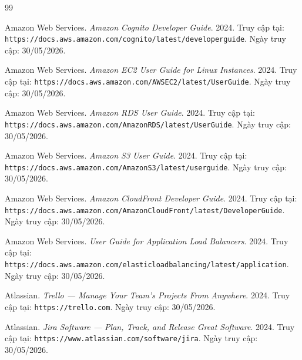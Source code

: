 \begin{thebibliography}{99}

Amazon Web Services. \textit{Amazon Cognito Developer Guide}. 2024. Truy cập tại: \texttt{https://docs.aws.amazon.com/cognito/latest/developerguide}. Ngày truy cập: 30/05/2026.

Amazon Web Services. \textit{Amazon EC2 User Guide for Linux Instances}. 2024. Truy cập tại: \texttt{https://docs.aws.amazon.com/AWSEC2/latest/UserGuide}. Ngày truy cập: 30/05/2026.

Amazon Web Services. \textit{Amazon RDS User Guide}. 2024. Truy cập tại: \texttt{https://docs.aws.amazon.com/AmazonRDS/latest/UserGuide}. Ngày truy cập: 30/05/2026.

Amazon Web Services. \textit{Amazon S3 User Guide}. 2024. Truy cập tại: \texttt{https://docs.aws.amazon.com/AmazonS3/latest/userguide}. Ngày truy cập: 30/05/2026.

Amazon Web Services. \textit{Amazon CloudFront Developer Guide}. 2024. Truy cập tại: \texttt{https://docs.aws.amazon.com/AmazonCloudFront/latest/DeveloperGuide}. Ngày truy cập: 30/05/2026.

Amazon Web Services. \textit{User Guide for Application Load Balancers}. 2024. Truy cập tại: \texttt{https://docs.aws.amazon.com/elasticloadbalancing/latest/application}. Ngày truy cập: 30/05/2026.

Atlassian. \textit{Trello — Manage Your Team's Projects From Anywhere}. 2024. Truy cập tại: \texttt{https://trello.com}. Ngày truy cập: 30/05/2026.

Atlassian. \textit{Jira Software — Plan, Track, and Release Great Software}. 2024. Truy cập tại: \texttt{https://www.atlassian.com/software/jira}. Ngày truy cập: 30/05/2026.

\end{thebibliography}
